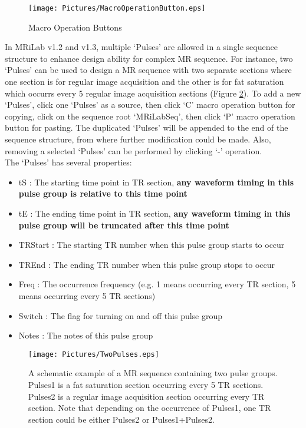 \documentclass{book}%
\begin{document}
\begin{enumerate}
\begin{figure}[htbp]
	\centering
		\texttt{[image: Pictures/MacroOperationButton.eps]}
	\caption{Macro Operation Buttons}
	\label{fig:MacroOperationButton}
\end{figure}

In MRiLab v1.2 and v1.3, multiple `Pulses' are allowed in a single sequence structure to enhance design ability for complex MR sequence. For instance, two `Pulses' can be used to design a MR sequence with two separate sections where one section is for regular image acquisition and the other is for fat saturation which occurrs every 5 regular image acquisition sections (Figure \ref{fig:TwoPulses}). To add a new `Pulses', click one `Pulses' as a source, then click `C' macro operation button for copying, click on the sequence root `MRiLabSeq', then click `P' macro operation button for pasting. The duplicated `Pulses' will be appended to the end of the sequence structure, from where further modification could be made. Also, removing a selected `Pulses' can be performed by clicking `-' operation. \\

The `Pulses' has several properties: 

\begin{itemize}
	\item tS : The starting time point in TR section, \textbf{any waveform timing in this pulse group is relative to this time point}
	\item tE : The ending time point in TR section, \textbf{any waveform timing in this pulse group will be truncated after this time point}
	\item TRStart : The starting TR number when this pulse group starts to occur
	\item TREnd : The ending TR number when this pulse group stops to occur
	\item Freq : The occurrence frequency (e.g. 1 means occurring every TR section, 5 means occurring every 5 TR sections)
	\item Switch : The flag for turning on and off this pulse group
	\item Notes : The notes of this pulse group
\end{itemize}

\begin{figure}[htbp]
	\centering
		\texttt{[image: Pictures/TwoPulses.eps]}
	\caption{A schematic example of a MR sequence containing two pulse groups. Pulses1 is a fat saturation section occurring every 5 TR sections. Pulses2 is a regular image acquisition section occurring every TR section. Note that depending on the occurrence of Pulses1, one TR section could be either Pulses2 or Pulses1+Pulses2.}
	\label{fig:TwoPulses}
\end{figure}


\end{enumerate}
\end{document}
